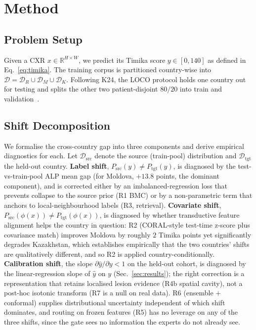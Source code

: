 \documentclass[runningheads]{llncs}
\begin{document}
\section{Method}
\label{sec:method}
\label{sec:framework}

\subsection{Problem Setup}

Given a CXR $x\in\mathbb{R}^{H\times W}$, we predict its Timika score $y\in[0,140]$ as defined in Eq.~\ref{eq:timika}. The training corpus is partitioned country-wise into $\mathcal{D}=\mathcal{D}_R\cup\mathcal{D}_M\cup\mathcal{D}_K$. Following K24, the LOCO protocol holds one country out for testing and splits the other two patient-disjoint $80/20$ into train and validation~\cite{kantipudi2024}.

\subsection{Shift Decomposition}

We formalise the cross-country gap into three components and derive empirical diagnostics for each. Let $\mathcal{D}_{\text{src}}$ denote the source (train-pool) distribution and $\mathcal{D}_{\text{tgt}}$ the held-out country. \textbf{Label shift}, $P_{\text{src}}(y){\neq}P_{\text{tgt}}(y)$, is diagnosed by the test-vs-train-pool ALP mean gap (for Moldova, $+13.8$ points, the dominant component), and is corrected either by an imbalanced-regression loss that prevents collapse to the source prior (R1 BMC) or by a non-parametric term that anchors to local-neighbourhood labels (R3, retrieval). \textbf{Covariate shift}, $P_{\text{src}}(\phi(x)){\neq}P_{\text{tgt}}(\phi(x))$, is diagnosed by whether transductive feature alignment helps the country in question: R2 (CORAL-style test-time z-score plus covariance match) improves Moldova by roughly $2$ Timika points yet significantly degrades Kazakhstan, which establishes empirically that the two countries' shifts are qualitatively different, and so R2 is applied country-conditionally. \textbf{Calibration shift}, the slope $\partial\hat{y}/\partial y<1$ on the held-out cohort, is diagnosed by the linear-regression slope of $\hat{y}$ on $y$ (Sec.~\ref{sec:results}); the right correction is a representation that retains localised lesion evidence (R4b spatial cavity), not a post-hoc isotonic transform (R7 is a null on real data). R6 (ensemble $+$ conformal) supplies distributional uncertainty independent of which shift dominates, and routing on frozen features (R5) has no leverage on any of the three shifts, since the gate sees no information the experts do not already see.
\end{document}
